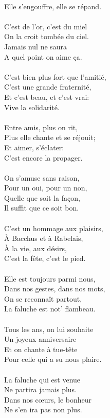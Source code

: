 {    \\Elle s'engouffre, elle se répand.
    \\\\C'est de l'or, c'est du miel
    \\On la croit tombée du ciel.
    \\Jamais nul ne saura
    \\A quel point on aime ça.
    \\\\C'est bien plus fort que l'amitié,
    \\C'est une grande fraternité,
    \\Et c'est beau, et c'est vrai:
    \\Vive la solidarité.
    \\\\Entre amis, plus on rit,
    \\Plus elle chante et se réjouit;
    \\Et aimer, s'éclater:
    \\C'est encore la propager.
    \\\\On s'amuse sans raison,
    \\Pour un oui, pour un non,
    \\Quelle que soit la façon,
    \\Il suffit que ce soit bon.
    \\\\C'est un hommage aux plaisirs,
    \\À Bacchus et à Rabelais,
    \\À la vie, aux désirs,
    \\C'est la fête, c'est le pied.
    \\\\Elle est toujours parmi nous,
    \\Dans nos gestes, dans nos mots,
    \\On se reconnaît partout,
    \\La faluche est not' flambeau.
    \\\\Tous les ans, on lui souhaite 
    \\Un joyeux anniversaire
    \\Et on chante à tue-tête 
    \\Pour celle qui a su nous plaire.
    \\\\La faluche qui est venue 
    \\Ne partira jamais plus.
    \\Dans nos cœurs, le bonheur 
    \\Ne s'en ira pas non plus.
}

\blackline
